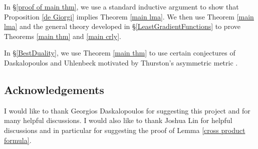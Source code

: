 In \S\ref{proof of main thm}, we use a standard inductive argument to show that Proposition \ref{de Giorgi} implies Theorem \ref{main lma}.
We then use Theorem \ref{main lma} and the general theory developed in \S\ref{LeastGradientFunctions} to prove Theorems \ref{main thm} and \ref{main crly}.

In \S\ref{BestDuality}, we use Theorem \ref{main thm} to use certain conjectures of Daskalopoulos and Uhlenbeck \cite{daskalopoulos2020transverse} motivated by Thurston's asymmetric metric \cite{thurston1998minimal}.


\subsection{Acknowledgements}
I would like to thank Georgios Daskalopoulos for suggesting this project and for many helpful discussions.
I would also like to thank Joshua Lin for helpful discussions and in particular for suggesting the proof of Lemma \ref{cross product formula}.
